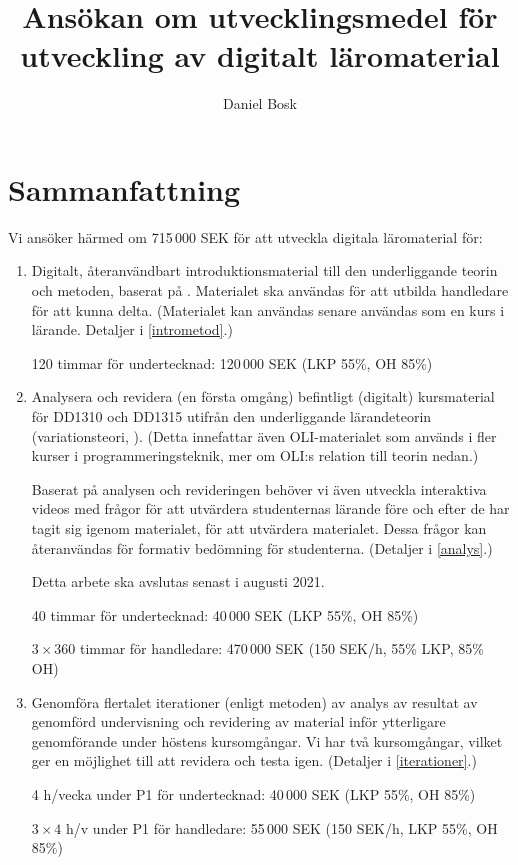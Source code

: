 \documentclass[a4paper,swedish]{article}
\title{Ansökan om utvecklingsmedel för utveckling av digitalt läromaterial}
\author{Daniel Bosk}
\affil{KTH EECS TCS, \texttt{dbosk@kth.se}}
\begin{document}
\maketitle

\section*{Sammanfattning}

Vi ansöker härmed om 715\,000 SEK för att utveckla digitala läromaterial för:
\begin{enumerate}
  \item Digitalt, återanvändbart introduktionsmaterial till den underliggande 
    teorin och metoden, baserat på \textcite{NecessaryConditionsOfLearning}. 
    Materialet ska användas för att utbilda handledare för att kunna delta.
    (Materialet kan användas senare användas som en kurs i lärande.
    Detaljer i \cref{intrometod}.)

    120 timmar för undertecknad: 120\,000 SEK (LKP 55\%, OH 85\%)

  \item Analysera och revidera (en första omgång) befintligt (digitalt) 
    kursmaterial för DD1310 och DD1315 utifrån den underliggande lärandeteorin 
    (variationsteori, \cite{NecessaryConditionsOfLearning}). (Detta innefattar 
    även OLI-materialet som används i fler kurser i programmeringsteknik, mer 
    om OLI:s relation till teorin nedan.)
    
    Baserat på analysen och revideringen behöver vi även utveckla interaktiva 
    videos med frågor för att utvärdera studenternas lärande före och efter de 
    har tagit sig igenom materialet, för att utvärdera materialet. Dessa frågor 
    kan återanvändas för formativ bedömning för studenterna.
    (Detaljer i \cref{analys}.)

    Detta arbete ska avslutas senast i augusti 2021.

    40 timmar för undertecknad: 40\,000 SEK (LKP 55\%, OH 85\%)

    \(3\times 360\) timmar för handledare: 470\,000 SEK (150 SEK/h, 55\% LKP, 
    85\% OH)

  \item Genomföra flertalet iterationer (enligt metoden) av analys av resultat 
    av genomförd undervisning och revidering av material inför ytterligare 
    genomförande under höstens kursomgångar. Vi har två kursomgångar, vilket 
    ger en möjlighet till att revidera och testa igen.
    (Detaljer i \cref{iterationer}.)

    4 h/vecka under P1 för undertecknad: 40\,000 SEK (LKP 55\%, OH 85\%)

    \(3\times 4\) h/v under P1 för handledare: 55\,000 SEK (150 SEK/h, LKP 
    55\%, OH 85\%)
\end{enumerate} 
\end{document}
